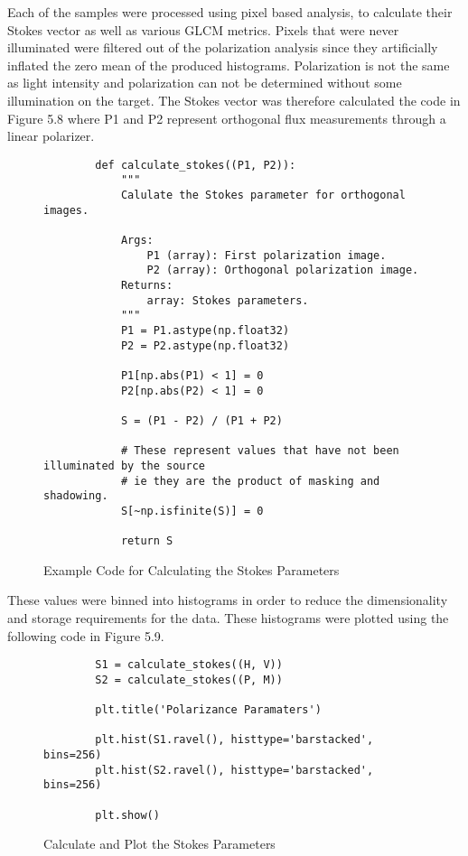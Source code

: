 Each of the samples were processed using pixel based analysis, to calculate their Stokes vector as well as various GLCM metrics.  Pixels that were never illuminated were filtered out of the polarization analysis since they artificially inflated the zero mean of the produced histograms.  Polarization is not the same as light intensity and polarization can not be determined without some illumination on the target.  The Stokes vector was therefore calculated the code in Figure 5.8 where P1 and P2 represent orthogonal flux measurements through a linear polarizer.
%
\begin{figure}
    \begin{lstlisting}
        def calculate_stokes((P1, P2)):
            """
            Calulate the Stokes parameter for orthogonal images.

            Args:
                P1 (array): First polarization image.
                P2 (array): Orthogonal polarization image.
            Returns:
                array: Stokes parameters.
            """
            P1 = P1.astype(np.float32)
            P2 = P2.astype(np.float32)

            P1[np.abs(P1) < 1] = 0
            P2[np.abs(P2) < 1] = 0

            S = (P1 - P2) / (P1 + P2)

            # These represent values that have not been illuminated by the source
            # ie they are the product of masking and shadowing.
            S[~np.isfinite(S)] = 0

            return S
    \end{lstlisting}
    \caption{Example Code for Calculating the Stokes Parameters}
    \label{fig:scattering}
\end{figure}
%
These values were binned into histograms in order to reduce the dimensionality and storage requirements for the data.  These histograms were plotted using the following code in Figure 5.9.
%
\begin{figure}
    \begin{lstlisting}
        S1 = calculate_stokes((H, V))
        S2 = calculate_stokes((P, M))

        plt.title('Polarizance Paramaters')

        plt.hist(S1.ravel(), histtype='barstacked', bins=256)
        plt.hist(S2.ravel(), histtype='barstacked', bins=256)

        plt.show()
    \end{lstlisting}
    \caption{Calculate and Plot the Stokes Parameters}
    \label{fig:scattering}
\end{figure}
